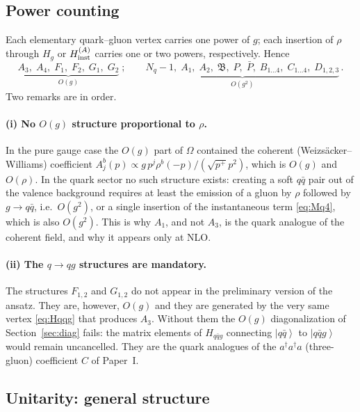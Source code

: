 \documentclass[11pt]{article}
\newcommand{\dg}{\dagger}
\newcommand{\ket}[1]{\left|#1\right\rangle}
\newcommand{\OM}{\Omega}
\newcommand{\Hqqg}{H_{q\bar q g}}
\newcommand{\Hg}{H_{g}}
\begin{document}
\subsection{Power counting}

Each elementary quark--gluon vertex carries one power of $g$; each insertion of $\rho$ through
$\Hg$ or $H^{(A)}_{\rm inst}$ carries one or two powers, respectively. Hence
\begin{equation}
\underbrace{A_3,\;A_4,\;F_1,\;F_2,\;G_1,\;G_2}_{O(g)}\;;\qquad
\underbrace{N_q-1,\;A_1,\;A_2,\;\mathfrak B,\;P,\;\bar P,\;B_{1\ldots4},\;C_{1\ldots4},\;
D_{1,2,3}}_{O(g^2)}\,.
\label{eq:counting}
\end{equation}
Two remarks are in order.

\paragraph{(i) No $O(g)$ structure proportional to $\rho$.} In the pure gauge case the
$O(g)$ part of $\OM$ contained the coherent (Weizs\"acker--Williams) coefficient
$A^b_j(p)\propto g\,p^j\rho^b(-p)/(\sqrt{p^+}p^2)$, which is $O(g)$ and $O(\rho)$. In the quark
sector no such structure exists: creating a soft $q\bar q$ pair out of the valence background
requires at least the emission of a gluon by $\rho$ followed by $g\to q\bar q$, i.e.\ $O(g^2)$,
or a single insertion of the instantaneous term \eqref{eq:Mq4}, which is also $O(g^2)$. This is
why $A_1$, and not $A_3$, is the quark analogue of the coherent field, and why it appears only at
NLO.

\paragraph{(ii) The $q\to qg$ structures are mandatory.} The structures $F_{1,2}$ and $G_{1,2}$ do
not appear in the preliminary version of the ansatz. They are, however, $O(g)$ and they are
generated by the very same vertex \eqref{eq:Hqqg} that produces $A_3$. Without them the $O(g)$
diagonalization of Section~\ref{sec:diag} fails: the matrix elements of $\Hqqg$ connecting
$\ket{q\bar q}$ to $\ket{q\bar q g}$ would remain uncancelled. They are the quark analogues of the
$a^\dg a^\dg a$ (three-gluon) coefficient $C$ of Paper~I.

\subsection{Unitarity: general structure}
\end{document}
